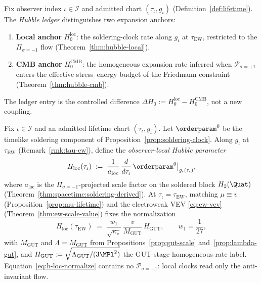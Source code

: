 \begin{definition}
\label{def:hubble-ledger}
Fix observer index $\iota\in\mathcal{I}$ and admitted chart
$(\tau_\iota,g_\iota)$ (Definition~\ref{def:lifetime}). The \emph{Hubble
ledger} distinguishes two expansion anchors:
\begin{enumerate}[label=(\roman*),leftmargin=*]
  \item \textbf{Local anchor} $H_0^{\mathrm{loc}}$: the soldering-clock rate
    along $g_\iota$ at $\tau_{\mathrm{EW}}$, restricted to the
    $\Pi_{\sigma=-1}$ flow (Theorem~\ref{thm:hubble-local}).
  \item \textbf{CMB anchor} $H_0^{\mathrm{CMB}}$: the homogeneous expansion
    rate inferred when $\mathcal{P}_{\sigma=+1}$ enters the effective
    stress--energy budget of the Friedmann constraint
    (Theorem~\ref{thm:hubble-cmb}).
\end{enumerate}
The ledger entry is the controlled difference
$\Delta H_0:=H_0^{\mathrm{loc}}-H_0^{\mathrm{CMB}}$, not a new coupling.
\end{definition}

\begin{lemma}
\label{lem:soldered-hubble}
Fix $\iota\in\mathcal{I}$ and an admitted lifetime chart
$(\tau_\iota,g_\iota)$. Let $\orderparam^0$ be the timelike soldering component
of Proposition~\ref{prop:soldering-clock}. Along $g_\iota$ at
$\tau_{\mathrm{EW}}$ (Remark~\ref{rmk:tau-ew}), define the
\emph{observer-local Hubble parameter}
\begin{equation}\label{eq:h-soldered}
  H_{\mathrm{loc}}(\tau_\iota)
  \;:=\;
  \frac{1}{a_{\mathrm{loc}}}\,
  \frac{d}{d\tau_\iota}\,
  \orderparam^0\big|_{g_\iota(\tau_\iota)},
\end{equation}
where $a_{\mathrm{loc}}$ is the $\Pi_{\sigma=-1}$-projected scale factor on
the soldered block $H_2(\Quat)$ (Theorem~\ref{thm:spacetime:soldering-derived}).
At $\tau_\iota=\tau_{\mathrm{EW}}$, matching $\mu\equiv v$
(Proposition~\ref{prop:mu-lifetime}) and the electroweak VEV
\eqref{eq:ew-vev} (Theorem~\ref{thm:ew-scale-value}) fixes the normalization
\begin{equation}\label{eq:h-loc-normalize}
  H_{\mathrm{loc}}(\tau_{\mathrm{EW}})
  \;=\;
  \frac{w_1}{\sqrt{\kappa_\star}}\,
  \frac{v}{M_{\mathrm{GUT}}}\,
  H_{\mathrm{GUT}},
  \qquad
  w_1=\frac{1}{27},
\end{equation}
with $M_{\mathrm{GUT}}$ and $\Lambda=M_{\mathrm{GUT}}$ from
Propositions~\ref{prop:gut-scale} and~\ref{prop:lambda-gut}, and
$H_{\mathrm{GUT}}:=\sqrt{\Lambda_{\mathrm{GUT}}/(3\MPl^2)}$ the GUT-stage
homogeneous rate label. Equation~\eqref{eq:h-loc-normalize} contains no
$\mathcal{P}_{\sigma=+1}$: local clocks read only the anti-invariant flow.
\end{lemma}

